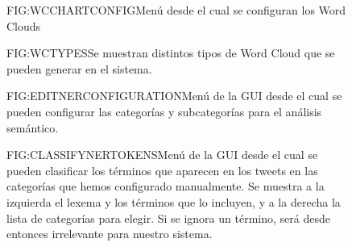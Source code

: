 \begin{figure}[Configuración de un Word Cloud]{FIG:WCCHARTCONFIG}{Menú desde el cual se configuran los Word Clouds}
\end{figure}

\begin{figure}[Diferentes tipos de World Cloud]{FIG:WCTYPES}{Se muestran distintos tipos de Word Cloud que se pueden generar en el sistema.}
	 \quad
	\quad
\end{figure}

\begin{figure}[Editando una configuración para el análisis semántico]{FIG:EDITNERCONFIGURATION}{Menú de la GUI desde el cual se pueden configurar las categorías y subcategorías para el análisis semántico.}
\end{figure}

\begin{figure}[Clasificando términos desde la GUI para entrenar el sistema.]{FIG:CLASSIFYNERTOKENS}{Menú de la GUI desde el cual se pueden clasificar los términos que aparecen en los tweets en las categorías que hemos configurado manualmente. Se muestra a la izquierda el lexema y los términos que lo incluyen, y a la derecha la lista de categorías para elegir. Si se ignora un término, será desde entonces irrelevante para nuestro sistema.}
\end{figure}